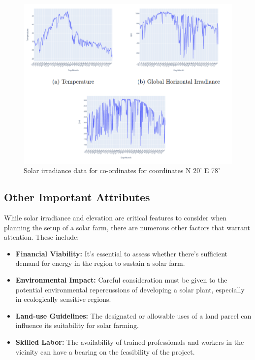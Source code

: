 \documentclass[a4paper,12pt]{Classes/RoboticsLaTeX}
\begin{document}
	\begin{figure}[H]
		\centering
		\includegraphics[width=1\textwidth]{Figures/Solar Graphs.png} %
		\caption{Solar irradiance data for co-ordinates for coordinates N 20' E 78'}
		\label{fig:my_label4} %
	\end{figure}

	\subsection{Other Important Attributes}

	While solar irradiance and elevation are critical features to consider when planning the setup of a solar farm, there are numerous other factors that warrant attention. 
	These include:

	\begin{itemize}
		\item \textbf{Financial Viability:} It's essential to assess whether there's sufficient demand for energy in the region to sustain a solar farm.
		
		\item \textbf{Environmental Impact:} Careful consideration must be given to the potential environmental repercussions of developing a solar plant, especially in ecologically sensitive regions.
		
		\item \textbf{Land-use Guidelines:} The designated or allowable uses of a land parcel can influence its suitability for solar farming.
		
		\item \textbf{Skilled Labor:} The availability of trained professionals and workers in the vicinity can have a bearing on the feasibility of the project.
	\end{itemize}
\end{document}
